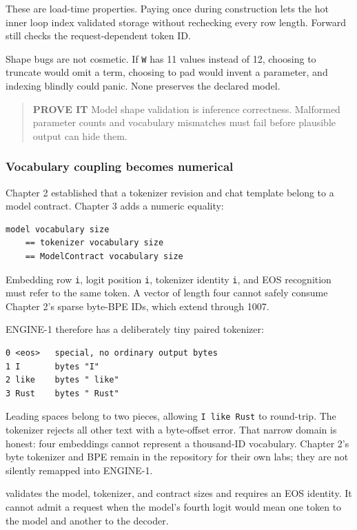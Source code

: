 \documentclass[
  10pt,
]{article}
\begin{document}
These are load-time properties. Paying once during construction lets the
hot inner loop index validated storage without rechecking every row
length. Forward still checks the request-dependent token ID.

Shape bugs are not cosmetic. If \texttt{W} has 11 values instead of 12,
choosing to truncate would omit a term, choosing to pad would invent a
parameter, and indexing blindly could panic. None preserves the declared
model.

\begin{quote}
\textbf{PROVE IT} Model shape validation is inference correctness.
Malformed parameter counts and vocabulary mismatches must fail before
plausible output can hide them.
\end{quote}

\subsubsection{Vocabulary coupling becomes
numerical}\label{vocabulary-coupling-becomes-numerical}

Chapter 2 established that a tokenizer revision and chat template belong
to a model contract. Chapter 3 adds a numeric equality:

\begin{verbatim}
model vocabulary size
    == tokenizer vocabulary size
    == ModelContract vocabulary size
\end{verbatim}

Embedding row \texttt{i}, logit position \texttt{i}, tokenizer identity
\texttt{i}, and EOS recognition must refer to the same token. A vector
of length four cannot safely consume Chapter 2's sparse byte-BPE IDs,
which extend through 1007.

ENGINE-1 therefore has a deliberately tiny paired tokenizer:

\begin{verbatim}
0 <eos>   special, no ordinary output bytes
1 I       bytes "I"
2 like    bytes " like"
3 Rust    bytes " Rust"
\end{verbatim}

Leading spaces belong to two pieces, allowing \texttt{I\ like\ Rust} to
round-trip. The tokenizer rejects all other text with a byte-offset
error. That narrow domain is honest: four embeddings cannot represent a
thousand-ID vocabulary. Chapter 2's byte tokenizer and BPE remain in the
repository for their own labs; they are not silently remapped into
ENGINE-1.

\texttt{} validates the model, tokenizer,
and contract sizes and requires an EOS identity. It cannot admit a
request when the model's fourth logit would mean one token to the model
and another to the decoder.
\end{document}
